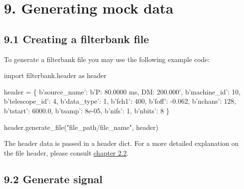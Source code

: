 \documentclass[]{article}
\newenvironment{Shaded}{}{}
\newcommand{\DecValTok}[1]{\textcolor[rgb]{0.25,0.63,0.44}{#1}}
\newcommand{\FloatTok}[1]{\textcolor[rgb]{0.25,0.63,0.44}{#1}}
\newcommand{\StringTok}[1]{\textcolor[rgb]{0.25,0.44,0.63}{#1}}
\newcommand{\ImportTok}[1]{#1}
\newcommand{\OperatorTok}[1]{\textcolor[rgb]{0.40,0.40,0.40}{#1}}
\newcommand{\NormalTok}[1]{#1}
\begin{document}
\section{9. Generating mock data}\label{generating-mock-data}

\subsection{9.1 Creating a filterbank
file}\label{creating-a-filterbank-file}

To generate a filterbank file you may use the following example code:

\begin{Shaded}
\begin{Highlighting}[]
\ImportTok{import}\NormalTok{ filterbank.header }\ImportTok{as}\NormalTok{ header}

\NormalTok{header }\OperatorTok{=}\NormalTok{ \{}
\NormalTok{    b}\StringTok{'source_name'}\NormalTok{: b}\StringTok{'P: 80.0000 ms, DM: 200.000'}\NormalTok{,}
\NormalTok{    b}\StringTok{'machine_id'}\NormalTok{: }\DecValTok{10}\NormalTok{,}
\NormalTok{    b}\StringTok{'telescope_id'}\NormalTok{: }\DecValTok{4}\NormalTok{,}
\NormalTok{    b}\StringTok{'data_type'}\NormalTok{: }\DecValTok{1}\NormalTok{,}
\NormalTok{    b}\StringTok{'fch1'}\NormalTok{: }\DecValTok{400}\NormalTok{,}
\NormalTok{    b}\StringTok{'foff'}\NormalTok{: }\OperatorTok{-}\FloatTok{0.062}\NormalTok{,}
\NormalTok{    b}\StringTok{'nchans'}\NormalTok{: }\DecValTok{128}\NormalTok{,}
\NormalTok{    b}\StringTok{'tstart'}\NormalTok{: }\FloatTok{6000.0}\NormalTok{,}
\NormalTok{    b}\StringTok{'tsamp'}\NormalTok{: }\FloatTok{8e-05}\NormalTok{,}
\NormalTok{    b}\StringTok{'nifs'}\NormalTok{: }\DecValTok{1}\NormalTok{,}
\NormalTok{    b}\StringTok{'nbits'}\NormalTok{: }\DecValTok{8}
\NormalTok{\}}

\NormalTok{header.generate_file(}\StringTok{"file_path/file_name"}\NormalTok{, header)}
\end{Highlighting}
\end{Shaded}

The header data is passed in a header dict. For a more detailed
explanation on the file header, please consult
\href{docs/filterbank.md\#22-read-the-header-from-filterbank-data}{chapter
2.2}.

\subsection{9.2 Generate signal}\label{generate-signal}
\end{document}
